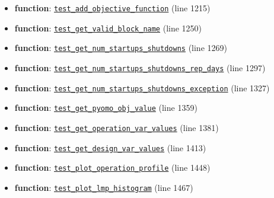 \documentclass[11pt]{report}
\begin{document}
\begin{itemize}[leftmargin=*]
  \item \textbf{function}: \hyperref[def:pricetaker-tests-test_price_taker_model.py:test_add_objective_function:L1215]{\texttt{test\_add\_objective\_function}} (line 1215)
  \item \textbf{function}: \hyperref[def:pricetaker-tests-test_price_taker_model.py:test_get_valid_block_name:L1250]{\texttt{test\_get\_valid\_block\_name}} (line 1250)
  \item \textbf{function}: \hyperref[def:pricetaker-tests-test_price_taker_model.py:test_get_num_startups_shutdowns:L1269]{\texttt{test\_get\_num\_startups\_shutdowns}} (line 1269)
  \item \textbf{function}: \hyperref[def:pricetaker-tests-test_price_taker_model.py:test_get_num_startups_shutdowns_rep_days:L1297]{\texttt{test\_get\_num\_startups\_shutdowns\_rep\_days}} (line 1297)
  \item \textbf{function}: \hyperref[def:pricetaker-tests-test_price_taker_model.py:test_get_num_startups_shutdowns_exception:L1327]{\texttt{test\_get\_num\_startups\_shutdowns\_exception}} (line 1327)
  \item \textbf{function}: \hyperref[def:pricetaker-tests-test_price_taker_model.py:test_get_pyomo_obj_value:L1359]{\texttt{test\_get\_pyomo\_obj\_value}} (line 1359)
  \item \textbf{function}: \hyperref[def:pricetaker-tests-test_price_taker_model.py:test_get_operation_var_values:L1381]{\texttt{test\_get\_operation\_var\_values}} (line 1381)
  \item \textbf{function}: \hyperref[def:pricetaker-tests-test_price_taker_model.py:test_get_design_var_values:L1413]{\texttt{test\_get\_design\_var\_values}} (line 1413)
  \item \textbf{function}: \hyperref[def:pricetaker-tests-test_price_taker_model.py:test_plot_operation_profile:L1448]{\texttt{test\_plot\_operation\_profile}} (line 1448)
  \item \textbf{function}: \hyperref[def:pricetaker-tests-test_price_taker_model.py:test_plot_lmp_histogram:L1467]{\texttt{test\_plot\_lmp\_histogram}} (line 1467)
\end{itemize}
\end{document}
